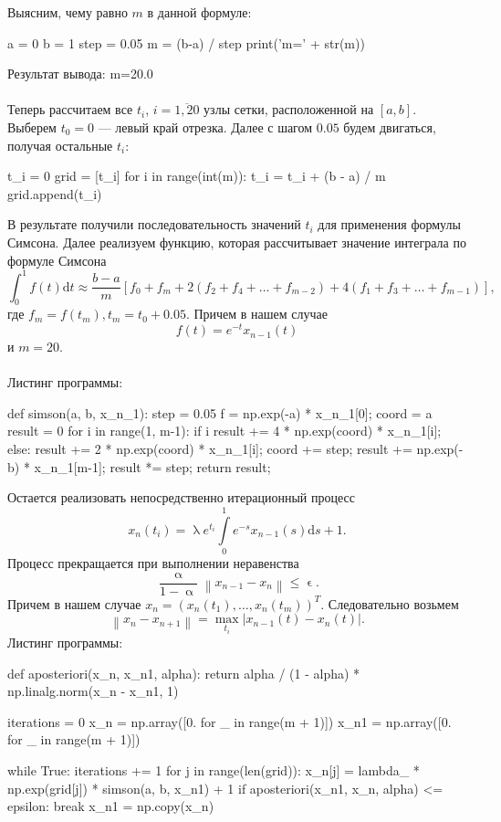\documentclass[a4paper, 12pt]{report}
\newcommand\Norm[1]{\left\| #1 \right\|}
\renewcommand{\leq}{\leqslant}
\renewcommand{\alpha}{\upalpha}
\renewcommand{\lambda}{\uplambda}
\renewcommand{\epsilon}{\upvarepsilon}
\begin{document}
			Выясним, чему равно $m$ в данной формуле:
			\begin{python}
				a = 0
				b = 1
				step = 0.05
				m = (b-a) / step
				print('m=' + str(m))\end{python} 
				Результат вывода:
				m=20.0\\\\
			Теперь рассчитаем все $t_i$, $i=\overline{1,20}$ узлы сетки, расположенной на $[a,b]$. Выберем $t_0 = 0$ --- левый край отрезка. Далее с шагом $0.05$ будем двигаться, получая остальные $t_i$:
			\begin{python}
				t_i = 0
				grid = [t_i]
				for i in range(int(m)):
					t_i = t_i + (b - a) / m
					grid.append(t_i)\end{python} 
			В результате получили последовательность значений $t_i$ для применения формулы Симсона. Далее реализуем функцию, которая рассчитывает значение интеграла по формуле Симсона $$\int_{0}^{1} f(t) \mathrm{d} t \approx \frac{b-a}{m}\left[f_{0}+f_{m}+2\left(f_{2}+f_{4}+\ldots+f_{m-2}\right)+4\left(f_{1}+f_{3}+\ldots+f_{m-1}\right)\right],$$ где $f_{m}=f\left(t_{m}\right), t_{m}=t_{0}+0.05$. Причем в нашем случае $$f(t) = e^{-t} x_{n-1}(t)$$ и $m=20$.\\\\ Листинг программы:
			\begin{python}
				def simson(a, b, x_n_1):
					step = 0.05
					f = np.exp(-a) * x_n_1[0];
					coord = a
					result = 0
					for i in range(1, m-1):
						if i %
							result += 4 * np.exp(coord) * x_n_1[i];
						else:
							result += 2 * np.exp(coord) * x_n_1[i];
						coord += step;
					result += np.exp(-b) * x_n_1[m-1];
					result *= step;
					return result;\end{python} 
			Остается реализовать непосредственно итерационный процесс  $$x_{n}\left(t_{i}\right)=\lambda e^{t_i}\int\limits_{0}^{1} e^{-s} x_{n-1}\left(s\right) \mathrm{d} s+1.$$
			Процесс прекращается при выполнении неравенства $$\dfrac{\alpha}{1 - \alpha}\Norm{x_{n-1} - x_{n}} \leq \epsilon.$$
			Причем в нашем случае $x_n = (x_n(t_1), \ldots, x_n(t_m))^T.$ Следовательно возьмем $$\Norm{x_n - x_{n+1}} = \underset{t_i}{\max}|x_{n-1}(t) - x_{n}(t)|.$$
			Листинг программы:
			\begin{python}
				def aposteriori(x_n, x_n1, alpha):
					return alpha / (1 - alpha) * np.linalg.norm(x_n - x_n1, 1)
				
				iterations = 0
				x_n = np.array([0. for _ in range(m + 1)])
				x_n1 = np.array([0. for _ in range(m + 1)])
				
				while True:
					iterations += 1
					for j in range(len(grid)):
						x_n[j] = lambda_ * np.exp(grid[j]) * simson(a, b, x_n1) + 1
					if aposteriori(x_n1, x_n, alpha) <= epsilon:
						break
					x_n1 = np.copy(x_n)\end{python}
\end{document}
